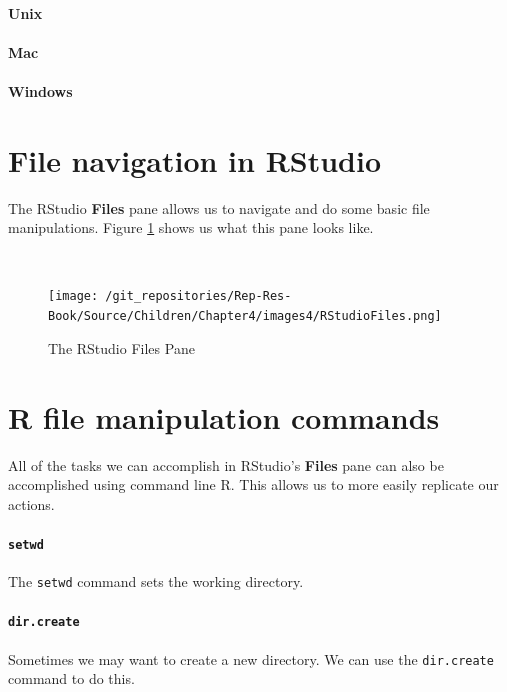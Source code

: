 \documentclass[ChapterTOCs,krantz1]{krantz}\usepackage{graphicx, color}
\begin{document}
\paragraph{Unix}

\paragraph{Mac}

\paragraph{Windows}

\section{File navigation in RStudio}

The RStudio {\bf{Files}} pane allows us to navigate and do some basic file manipulations. Figure \ref{FilesPane} shows us what this pane looks like.

\begin{figure}[t!]
    \caption{The RStudio Files Pane} \\[0.25cm]
    \label{FilesPane}
        \begin{center}    
        \texttt{[image: /git\_repositories/Rep-Res-Book/Source/Children/Chapter4/images4/RStudioFiles.png]}
        \end{center}
\end{figure}

\section{R file manipulation commands}

All of the tasks we can accomplish in RStudio's {\bf{Files}} pane can also be accomplished using command line R. This allows us to more easily replicate our actions. 

\paragraph{{\tt{setwd}}}

The {\tt{setwd}} command sets the working directory.

\paragraph{{\tt{dir.create}}}

Sometimes we may want to create a new directory. We can use the {\tt{dir.create}} command to do this.
\end{document}
